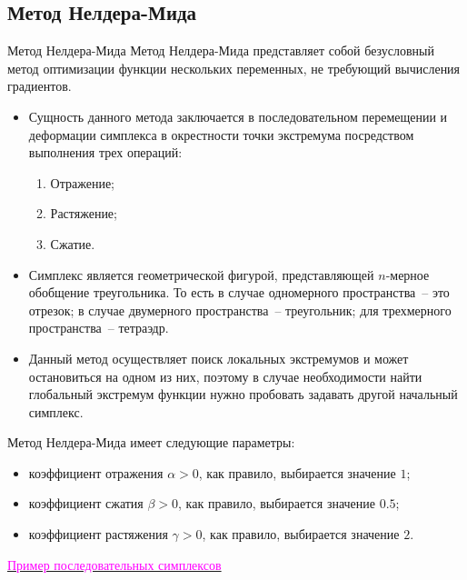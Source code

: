 \documentclass[aspectratio=169, mathserif]{beamer}	%
\begin{document}
\subsection{Метод Нелдера-Мида}

\begin{frame}[fragile]{Метод Нелдера-Мида}
\scriptsize
Метод Нелдера-Мида представляет собой безусловный метод оптимизации функции нескольких переменных, не требующий вычисления градиентов.
\begin{itemize}
	\item Сущность данного метода заключается в последовательном перемещении и деформации симплекса в окрестности точки экстремума посредством выполнения трех операций:

\begin{enumerate}
	\scriptsize
	\item Отражение;
	\item Растяжение;
	\item Сжатие.
\end{enumerate}

	\item Симплекс является геометрической фигурой, представляющей $n$-мерное обобщение треугольника. То есть в случае одномерного пространства~-- это отрезок; в случае двумерного пространства~-- треугольник; для трехмерного пространства~-- тетраэдр.
	\item Данный метод осуществляет поиск локальных экстремумов и может остановиться на одном из них, поэтому в случае необходимости найти глобальный экстремум функции нужно пробовать задавать другой начальный симплекс.
\end{itemize}
Метод Нелдера-Мида  имеет следующие параметры:
\begin{itemize}
	\item коэффициент отражения $\alpha > 0$, как правило, выбирается значение $1$;
	\item коэффициент сжатия $\beta > 0$, как правило, выбирается значение $0.5$;
	\item коэффициент растяжения $\gamma > 0$, как правило, выбирается значение $2$.
\end{itemize}
\vfill
\href{https://ru.wikipedia.org/wiki/%D0%9C%D0%B5%D1%82%D0%BE%D0%B4_%D0%9D%D0%B5%D0%BB%D0%B4%D0%B5%D1%80%D0%B0_%E2%80%94_%D0%9C%D0%B8%D0%B4%D0%B0#/media/%D0%A4%D0%B0%D0%B9%D0%BB:Nelder_Mead1.gif}{\textcolor{magenta}{Пример последовательных симплексов}}
\vfill
\end{frame}
\end{document}
